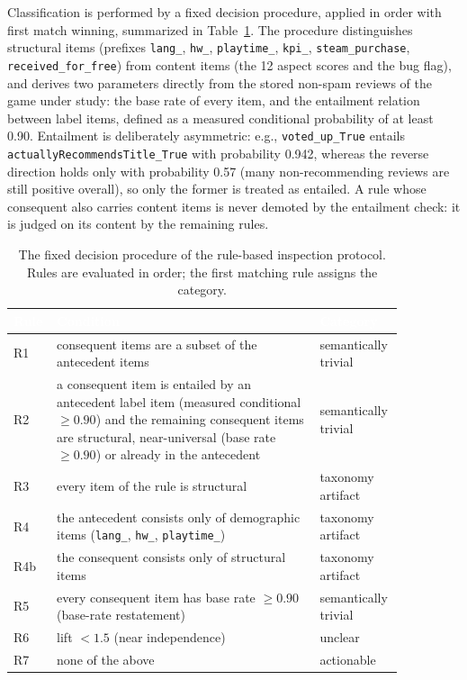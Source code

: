 Classification is performed by a fixed decision procedure, applied in order with first match winning, summarized in Table~\ref{tab:classification_rules}. The procedure distinguishes structural items (prefixes \texttt{lang\_}, \texttt{hw\_}, \texttt{playtime\_}, \texttt{kpi\_}, \texttt{steam\_\allowbreak purchase}, \texttt{received\_\allowbreak for\_\allowbreak free}) from content items (the 12 aspect scores and the bug flag), and derives two parameters directly from the stored non-spam reviews of the game under study: the base rate of every item, and the entailment relation between label items, defined as a measured conditional probability of at least 0.90. Entailment is deliberately asymmetric: e.g., \texttt{voted\_up\_True} entails \texttt{actuallyRecommendsTitle\_True} with probability 0.942, whereas the reverse direction holds only with probability 0.57 (many non-recommending reviews are still positive overall), so only the former is treated as entailed. A rule whose consequent also carries content items is never demoted by the entailment check: it is judged on its content by the remaining rules.

\begin{table}[H]
    \centering
    \caption{The fixed decision procedure of the rule-based inspection protocol. Rules are evaluated in order; the first matching rule assigns the category.}
    \label{tab:classification_rules}
    \begin{tabular}{>{\centering\arraybackslash}p{0.07\linewidth} >{\raggedright\arraybackslash}p{0.64\linewidth} >{\raggedright\arraybackslash}p{0.15\linewidth}}
        \toprule
        \rowcolor{black}
        \textbf{\textcolor{white}{Rule}} & \textbf{\textcolor{white}{Condition}} & \textbf{\textcolor{white}{Category}}\\
        \midrule
        R1 & consequent items are a subset of the antecedent items & semantically trivial\\
        R2 & a consequent item is entailed by an antecedent label item (measured conditional $\geq 0.90$) and the remaining consequent items are structural, near-universal (base rate $\geq 0.90$) or already in the antecedent & semantically trivial\\
        R3 & every item of the rule is structural & taxonomy artifact\\
        R4 & the antecedent consists only of demographic items (\texttt{lang\_}, \texttt{hw\_}, \texttt{playtime\_}) & taxonomy artifact\\
        R4b & the consequent consists only of structural items & taxonomy artifact\\
        R5 & every consequent item has base rate $\geq 0.90$ (base-rate restatement) & semantically trivial\\
        R6 & lift $< 1.5$ (near independence) & unclear\\
        R7 & none of the above & actionable\\
        \bottomrule
    \end{tabular}
\end{table}

